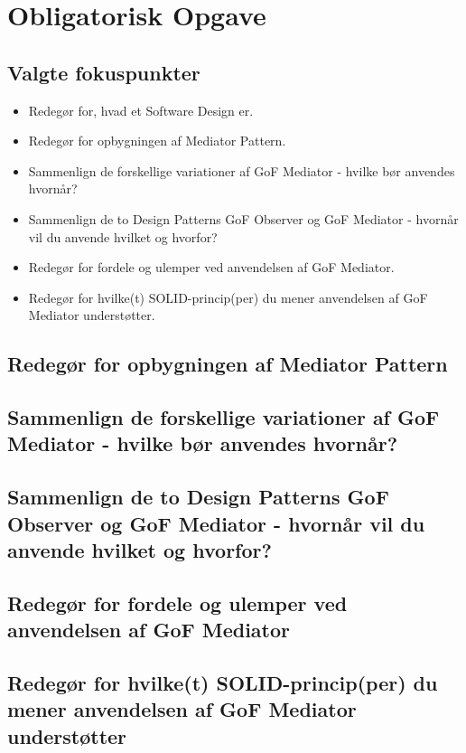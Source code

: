\section{Obligatorisk Opgave}

\subsection{Valgte fokuspunkter}

\begin{itemize}
	\item Redegør for, hvad et Software Design er.
	\item Redegør for opbygningen af Mediator Pattern.
	\item Sammenlign de forskellige variationer af GoF Mediator - hvilke bør anvendes hvornår?
	\item Sammenlign de to Design Patterns GoF Observer og GoF Mediator - hvornår vil du anvende hvilket og hvorfor?
	\item Redegør for fordele og ulemper ved anvendelsen af GoF Mediator.
	\item Redegør for hvilke(t) SOLID-princip(per) du mener anvendelsen af GoF Mediator understøtter.
\end{itemize}



\subsection{Redegør for opbygningen af Mediator Pattern}

\subsection{Sammenlign de forskellige variationer af GoF Mediator - hvilke bør anvendes hvornår?}

\subsection{Sammenlign de to Design Patterns GoF Observer og GoF Mediator - hvornår vil du anvende hvilket og hvorfor?}

\subsection{Redegør for fordele og ulemper ved anvendelsen af GoF Mediator}

\subsection{Redegør for hvilke(t) SOLID-princip(per) du mener anvendelsen af GoF Mediator understøtter}